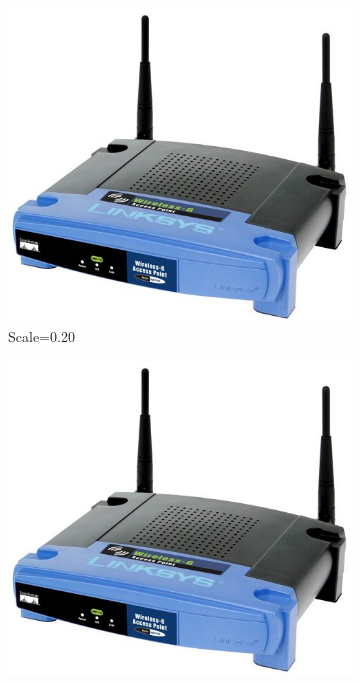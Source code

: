 \documentclass[a4paper,11pt]{article}
\begin{document}
\begin{figure}[hbp]
	\centering
	\begin{subfigure}[b]{0.3\textwidth}
		\centering
		\includegraphics[scale=0.20]{linksys}
		\caption{Scale=0.20}
	\end{subfigure}
	\begin{subfigure}[b]{0.3\textwidth}
		\centering		
		\includegraphics[scale=0.15]{linksys}

\end{subfigure}
\end{figure}
\end{document}
